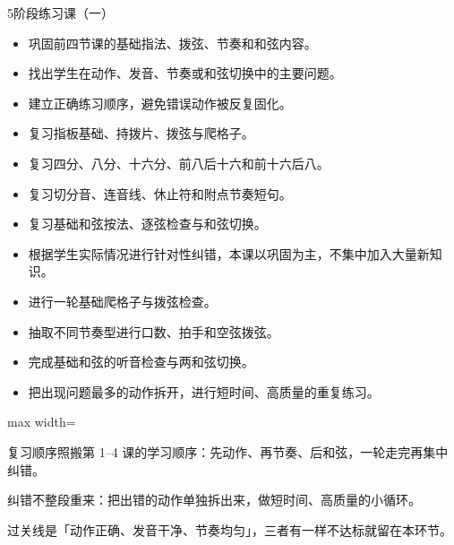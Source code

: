 \begin{lessoncard}{5}{阶段练习课（一）}
\begin{itemize}
\item 巩固前四节课的基础指法、拨弦、节奏和和弦内容。
\item 找出学生在动作、发音、节奏或和弦切换中的主要问题。
\item 建立正确练习顺序，避免错误动作被反复固化。
\end{itemize}
\begin{itemize}
\item 复习指板基础、持拨片、拨弦与爬格子。
\item 复习四分、八分、十六分、前八后十六和前十六后八。
\item 复习切分音、连音线、休止符和附点节奏短句。
\item 复习基础和弦按法、逐弦检查与和弦切换。
\item 根据学生实际情况进行针对性纠错，本课以巩固为主，不集中加入大量新知识。
\end{itemize}
\begin{itemize}
\item 进行一轮基础爬格子与拨弦检查。
\item 抽取不同节奏型进行口数、拍手和空弦拨弦。
\item 完成基础和弦的听音检查与两和弦切换。
\item 把出现问题最多的动作拆开，进行短时间、高质量的重复练习。
\end{itemize}
\begin{fignote}
\begin{center}
\begin{adjustbox}{max width=\textwidth}
\steparrow
{}\steparrow
{}\steparrow
{}
\end{adjustbox}
\end{center}
\begin{fignotes}
\item 复习顺序照搬第 1--4 课的学习顺序：先动作、再节奏、后和弦，一轮走完再集中纠错。
\item 纠错不整段重来：把出错的动作单独拆出来，做短时间、高质量的小循环。
\item 过关线是「动作正确、发音干净、节奏均匀」，三者有一样不达标就留在本环节。
\end{fignotes}
\end{fignote}
\end{lessoncard}


